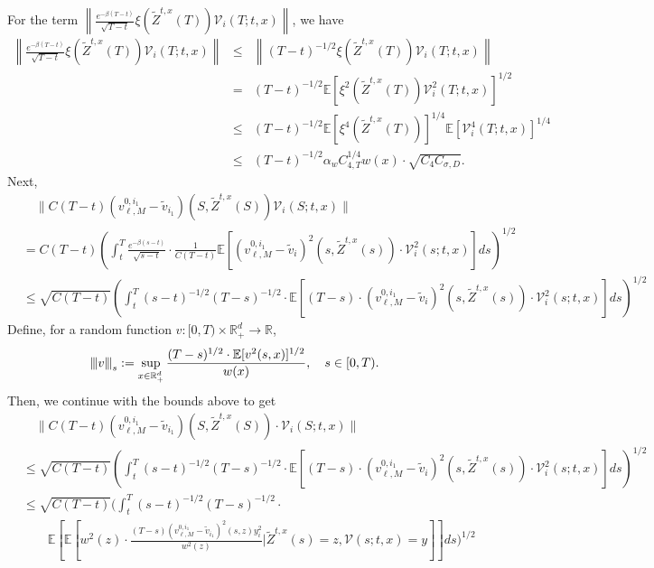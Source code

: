 \documentclass[11pt]{article}
\theoremstyle{definition}
\theoremstyle{plain}
\newcommand{\E}{\mathbb{E}}
\newcommand{\vertiii}[1]{{\left\vert\kern-0.25ex\left\vert\kern-0.25ex\left\vert #1 
    \right\vert\kern-0.25ex\right\vert\kern-0.25ex\right\vert}}
\begin{document}
\begin{appendices}
  For the term $\left\|\frac{e^{-\beta (T-t)}}{\sqrt{T-t}}\xi\left(\tilde{Z}^{t,x}(T)\right) \mathcal{V}_i\left(T; t,x\right) \right\|$, we have
  \begin{eqnarray*}
  \left\|\frac{e^{-\beta (T-t)}}{\sqrt{T-t}}\xi\left(\tilde{Z}^{t,x}(T)\right) \mathcal{V}_i\left(T; t,x\right) \right\| 
  &\leq& \left\| (T-t)^{-1/2} \xi(\tilde{Z}^{t,x}(T)) \mathcal{V}_i(T; t,x) \right\| \\
  &=& (T-t)^{-1/2}\E\left[\xi^2(\tilde{Z}^{t,x}(T)) \mathcal{V}_i^2(T; t,x)\right]^{1/2} \\
  &\leq &(T-t)^{-1/2} \E\left[\xi^4(\tilde{Z}^{t,x}(T))\right]^{1/4} \E\left[\mathcal{V}_i^4(T; t,x)\right]^{1/4} \\
  &\leq &(T-t)^{-1/2} \alpha_w C_{4,T}^{1/4} w(x) \cdot \sqrt{C_4 C_{\sigma, D}}.
  \end{eqnarray*}
  Next,
  \begin{align*}
  & \quad \| C(T - t)(v_{\ell,M}^{0,i_1} - \tilde{v}_{i_1})(S, \tilde{Z}^{t,x}(S)) \mathcal{V}_i(S; t,x) \| \\
  &= C(T - t) \left( \int_t^T \frac{e^{-\beta(s - t)}}{\sqrt{s-t}} \cdot \frac{1}{C(T-t)}\mathbb{E} \left[ (v_{\ell,M}^{0,i_1} - \tilde{v}_i)^2(s, \tilde{Z}^{t,x}(s))
  \cdot \mathcal{V}_i^2(s; t,x) \right] ds \right)^{1/2} \\
  &\leq \sqrt{C(T - t)}\left( \int_t^T (s - t)^{-1/2} (T - s)^{-1/2} \cdot 
  \mathbb{E}[(T-s)\cdot (v_{\ell,M}^{0,i_1} - \tilde{v}_i)^2(s, \tilde{Z}^{t,x}(s)) \cdot \mathcal{V}_i^2(s; t,x)] ds \right)^{1/2}
  \end{align*}
  Define, for a random function $v: [0,T) \times \mathbb{R}_+^d \to \mathbb{R}$, 
  \[
  \vertiii{v}_{s} := \sup_{x \in \mathbb{R}_+^d} \frac{(T - s)^{1/2} \cdot \mathbb{E}[v^2(s,x)]^{1/2}}{w(x)}, 
  \quad s \in [0,T).
  \]
  Then, we continue with the bounds above to get
  \begin{align*}
  & \quad \| C(T - t) (v_{\ell,M}^{0,i_1} - \tilde{v}_{i_1})(S, \tilde{Z}^{t,x}(S)) \cdot \mathcal{V}_i(S; t,x) \| \\
  &\leq \sqrt{C(T - t)}\left( \int_t^T (s - t)^{-1/2} (T - s)^{-1/2} \cdot 
  \mathbb{E}[(T-s)\cdot (v_{\ell,M}^{0,i_1} - \tilde{v}_i)^2(s, \tilde{Z}^{t,x}(s)) \cdot \mathcal{V}_i^2(s; t,x)] ds \right)^{1/2} \\
  &\leq \sqrt{C(T - t)}\Bigg( \int_t^T (s - t)^{-1/2} (T - s)^{-1/2} \cdot \\
  & \qquad \E\left[\mathbb{E} \left[ w^2(z) \cdot \frac{(T-s) (v_{\ell,M}^{0, i_1} - \tilde{v}_{i_1})^2(s, z) y_i^2}{w^2(z)} \Bigg|\tilde{Z}^{t,x}(s) = z, \mathcal{V}(s; t,x) = y\right]\right] ds \Bigg)^{1/2} \\

\end{align*}
\end{appendices}
\end{document}
